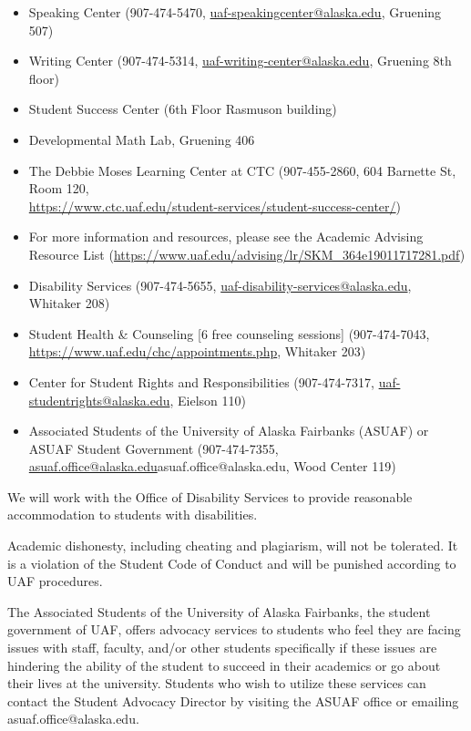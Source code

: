 \documentclass[12pt]{article}
\def\mailto#1{\href{mailto:#1}{#1}}
\begin{document}
\begin{itemize}
\setlength\itemsep{0em}
        \item Speaking Center (907-474-5470,
        \mailto{uaf-speakingcenter@alaska.edu}, Gruening 507)
\item Writing Center (907-474-5314, \mailto{uaf-writing-center@alaska.edu}, Gruening 8th floor)
\item Student Success Center (6th Floor Rasmuson building)
\item Developmental Math Lab, Gruening 406
\item The Debbie Moses Learning Center at CTC (907-455-2860, 604 Barnette St, Room 120,\\ \mailto{https://www.ctc.uaf.edu/student-services/student-success-center/})
\item For more information and resources, please see the Academic Advising Resource List (\url{https://www.uaf.edu/advising/lr/SKM_364e19011717281.pdf})
\end{itemize}





\begin{itemize}
\setlength\itemsep{0em}
\item Disability Services (907-474-5655, \mailto{uaf-disability-services@alaska.edu}, Whitaker 208)
\item Student Health \& Counseling [6 free counseling sessions] (907-474-7043, \url{https://www.uaf.edu/chc/appointments.php}, Whitaker 203)
\item Center for Student Rights and Responsibilities (907-474-7317, \mailto{uaf-studentrights@alaska.edu}, Eielson 110)
\item Associated Students of the University of Alaska Fairbanks (ASUAF) or ASUAF Student Government (907-474-7355, \mailto{asuaf.office@alaska.edu}{asuaf.office@alaska.edu}, Wood Center 119)
\end{itemize}

 We will work with the Office of Disability Services to provide reasonable accommodation to students with disabilities.

Academic dishonesty, including cheating and plagiarism, will not
be tolerated.  It is a violation of the Student Code of Conduct
and will be punished according to UAF procedures.

 The Associated Students of the University of Alaska Fairbanks, the student government of UAF, offers advocacy services to students who feel they are facing issues with staff, faculty, and/or other students specifically if these issues are hindering the ability of the student to succeed in their academics or go about their lives at the university. Students who wish to utilize these services can contact the Student Advocacy Director by visiting the ASUAF office or emailing asuaf.office@alaska.edu.
\end{document}
